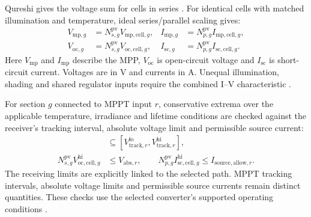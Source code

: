 Qureshi gives the voltage sum for cells in series \citep[Sec.~3.1.1, Eq.~(3-1)]{review-1017}. For identical cells with matched illumination and temperature, ideal series/parallel scaling gives:
\begin{equation}
    \begin{aligned}
        V_{\mathrm{mp},g}&=N_{s,g}^{\mathrm{pv}}V_{\mathrm{mp,cell},g},
        & I_{\mathrm{mp},g}&=N_{p,g}^{\mathrm{pv}}I_{\mathrm{mp,cell},g},\\
        V_{\mathrm{oc},g}&=N_{s,g}^{\mathrm{pv}}V_{\mathrm{oc,cell},g},
        & I_{\mathrm{sc},g}&=N_{p,g}^{\mathrm{pv}}I_{\mathrm{sc,cell},g}.
    \end{aligned}
    \label{eq:pv-assembly-ratings}
\end{equation}
Here $V_{\mathrm{mp}}$ and $I_{\mathrm{mp}}$ describe the MPP, $V_{\mathrm{oc}}$ is open-circuit voltage and $I_{\mathrm{sc}}$ is short-circuit current. Voltages are in V and currents in A. Unequal illumination, shading and shared regulator inputs require the combined I--V characteristic \citep[Secs.~2.1--2.2]{review-0573}.

For section $g$ connected to MPPT input $r$, conservative extrema over the applicable temperature, irradiance and lifetime conditions are checked against the receiver's tracking interval, absolute voltage limit and permissible source current:
\begin{align}
    [N_{s,g}^{\mathrm{pv}}V_{\mathrm{mp,cell},g}^{\mathrm{lo}},
     N_{s,g}^{\mathrm{pv}}V_{\mathrm{mp,cell},g}^{\mathrm{hi}}]
    &\subseteq[V_{\mathrm{track},r}^{\mathrm{lo}},V_{\mathrm{track},r}^{\mathrm{hi}}],
    \label{eq:mppt-voltage-compatibility}\\
    N_{s,g}^{\mathrm{pv}}V_{\mathrm{oc,cell},g}^{\mathrm{hi}}&\leq V_{\mathrm{abs},r},
    \qquad N_{p,g}^{\mathrm{pv}}I_{\mathrm{sc,cell},g}^{\mathrm{hi}}\leq I_{\mathrm{source,allow},r}.
    \label{eq:pv-input-ratings}
\end{align}
The receiving limits are explicitly linked to the selected path. MPPT tracking intervals, absolute voltage limits and permissible source currents remain distinct quantities. These checks use the selected converter's supported operating conditions \citep[Sec.~7.1]{handpicked-0003}.

